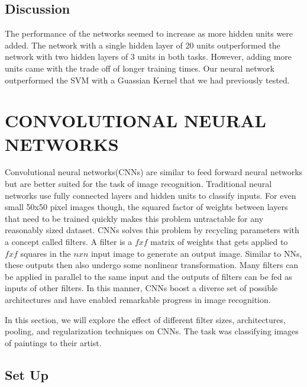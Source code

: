 \documentclass[10pt,twoside]{article}
\begin{document}
\subsection{Discussion}

The performance of the networks seemed to increase as more hidden units were added. The network with a single hidden layer of 20 units outperformed the network with two hidden layers of 3 units in both tasks. However, adding more units came with the trade off of longer training times. Our neural network outperformed the SVM with a Guassian Kernel that we had previously tested. 


\section{\uppercase{Convolutional Neural Networks}}

\noindent Convolutional neural networks(CNNs) are similar to feed forward neural networks but are better suited for the task of image recognition. Traditional neural networks use fully connected layers and hidden units to classify inputs. For even small 50x50 pixel images though, the squared factor of weights between layers that need to be trained quickly makes this problem untractable for any reasonably sized dataset.  CNNs solves this problem by recycling parameters with a concept called filters. A filter is a $fxf$ matrix of weights that gets applied to $fxf$ squares in the $nxn$ input image to generate an output image. Similar to NNs, these outputs then also undergo some nonlinear transformation. Many filters can be applied in parallel to the same input and the outputs of filters can be fed as inputs of other filters. In this manner, CNNs boost a diverse set of possible architectures and have enabled remarkable progress in image recognition.

In this section, we will explore the effect of different filter sizes, architectures, pooling, and regularization techniques on CNNs. The task was classifying images of paintings to their artist.

\subsection{Set Up}
\end{document}
